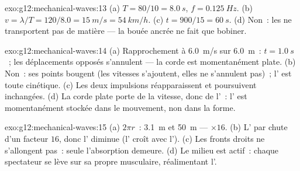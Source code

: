 \begin{solution}{exo:g12:mechanical-waves:13}
(a) $T = 80/10 = \qty{8.0}{s}$, $f = \qty{0.125}{Hz}$.
(b) $v = \lambda/T = 120/8.0 = \qty{15}{m/s} = \qty{54}{km/h}$.
(c) $t = 900/15 = \qty{60}{s}$. (d) Non~: les  ne transportent
pas de matière --- la bouée ancrée ne fait que bobiner.
\end{solution}

\begin{solution}{exo:g12:mechanical-waves:14}
(a) Rapprochement à \qty{6.0}{m/s} sur \qty{6.0}{m}~: $t = \qty{1.0}{s}$~;
les déplacements opposés s'annulent --- la corde est momentanément plate.
(b) Non~: ses points bougent (les vitesses  s'ajoutent,
elles ne s'annulent pas)~; l' est toute cinétique. (c) Les deux
impulsions réapparaissent et poursuivent inchangées. (d) La corde plate
porte de la vitesse, donc de l'~: l' est
momentanément stockée dans le mouvement, non dans la forme.
\end{solution}

\begin{solution}{exo:g12:mechanical-waves:15}
(a) $2\pi r$~: \qty{3.1}{m} et \qty{50}{m} --- $\times 16$.
(b) L' par  chute d'un facteur $16$, donc
l' diminue (l' croît avec
l'). (c) Les fronts droits ne s'allongent pas~: seule
l'absorption demeure. (d) Le milieu est actif~: chaque spectateur se lève
sur sa propre  musculaire, réalimentant l'.
\end{solution}

